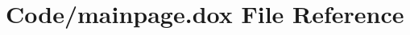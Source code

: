 \hypertarget{mainpage_8dox}{\section{\-Code/mainpage.dox \-File \-Reference}
\label{mainpage_8dox}
}
